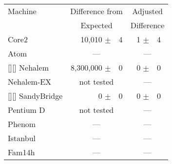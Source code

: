 
\begin{tabular}{|l||rl|rl|}

\hline
Machine   & \multicolumn{2}{c|}{Difference from} & \multicolumn{2}{c|}{Adjusted} \\
          & \multicolumn{2}{c|}{Expected}        & \multicolumn{2}{c|}{Difference} \\
\hline
\hline

Core2           & 10,010 $\pm$ & 4           &          1 $\pm$ & 4 \\
\hline
Atom            & \multicolumn{2}{c|}{---}   &  \multicolumn{2}{c|}{---}\\
\hline
\rowcolor{yellow}[\tabcolsep][\tabcolsep]
Nehalem        & 8,300,000 $\pm$ & 0          & 0 $\pm$ & 0 \\
\hline
Nehalem-EX     & \multicolumn{2}{c|}{not tested}  & \multicolumn{2}{c|}{---}\\
\hline
\rowcolor{yellow}[\tabcolsep][\tabcolsep]
 SandyBridge    &       0 $\pm$ & 0            &    0 $\pm$ &  0 \\
\hline
Pentium D      & \multicolumn{2}{c|}{not tested} &  \multicolumn{2}{c|}{---}\\
\hline
Phenom         & \multicolumn{2}{c|}{---} &   \multicolumn{2}{c|}{---}\\
\hline
Istanbul       & \multicolumn{2}{c|}{---} &   \multicolumn{2}{c|}{---}\\
\hline
Fam14h         & \multicolumn{2}{c|}{---} &   \multicolumn{2}{c|}{---}\\
\hline
\end{tabular}


